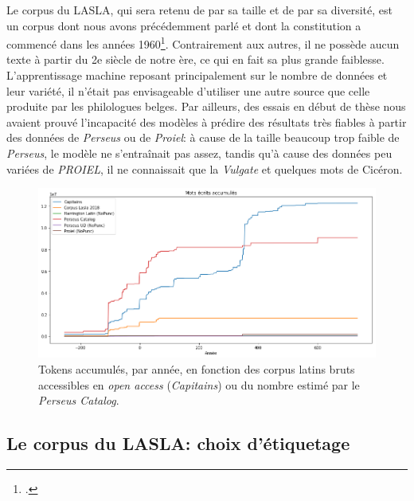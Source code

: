 Le corpus du LASLA, qui sera retenu de par sa taille et de par sa diversité, est un corpus dont nous avons précédemment parlé et dont la constitution a commencé dans les années 1960\footcites{delatte_laboratoire_1961}{BodsonCodification1966}. Contrairement aux autres, il ne possède aucun texte à partir du 2e siècle de notre ère, ce qui en fait sa plus grande faiblesse. L'apprentissage machine reposant principalement sur le nombre de données et leur variété, il n'était pas envisageable d'utiliser une autre source que celle produite par les philologues belges. Par ailleurs, des essais en début de thèse nous avaient prouvé l'incapacité des modèles à prédire des résultats très fiables à partir des données de \textit{Perseus} ou de \textit{Proiel}: à cause de la taille beaucoup trop faible de \textit{Perseus}, le modèle ne s'entraînait pas assez, tandis qu'à cause des données peu variées de \textit{PROIEL}, il ne connaissait que la \textit{Vulgate} et quelques mots de Cicéron.

\begin{figure}
    \includegraphics[width=\linewidth]{results/lemmatisation/corpus/tokens_per_year.png}
    \caption{Tokens accumulés, par année, en fonction des corpus latins bruts accessibles en \textit{open access} (\textit{Capitains}) ou du nombre estimé  par le \textit{Perseus Catalog}.}
    \label{fig:lemmatisation:corpus-entrainement}
\end{figure}

\subsection{Le corpus du LASLA: choix d'étiquetage}

